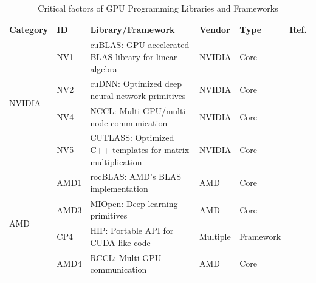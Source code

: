 \begin{table}[htbp]
	\centering
	\caption{Critical factors of GPU Programming Libraries and Frameworks}
	\label{tab:gpu_libraries}
	\begin{tabular}{llp{8cm}lll}
		\hline
		\small \textbf{Category} & \small \textbf{ID} & \small \textbf{Library/Framework}                                 & \small \textbf{Vendor} & \small \textbf{Type} & \small \textbf{Ref.}                                  \\
		\hline
		\multirow{4}{*}{\small NVIDIA}
		                         & \small NV1         & \small cuBLAS: GPU-accelerated BLAS library for linear algebra    & \small NVIDIA          & \small Core          & \small \cite{noauthor_cublas_nodate}                  \\[1ex]
		                         & \small NV2         & \small cuDNN: Optimized deep neural network primitives            & \small NVIDIA          & \small Core          & \small \cite{chetlur_cudnn_2014}                      \\[1ex]
		                         & \small NV4         & \small NCCL: Multi-GPU/multi-node communication                   & \small NVIDIA          & \small Core          & \small \cite{noauthor_nvidianccl_2025}                \\[1ex]
		                         & \small NV5         & \small CUTLASS: Optimized C++ templates for matrix multiplication & \small NVIDIA          & \small Core          & \small \cite{thakkar_cutlass_2023}                    \\
		\hline
		\multirow{4}{*}{\small AMD}
		                         & \small AMD1        & \small rocBLAS: AMD's BLAS implementation                         & \small AMD             & \small Core          & \small \cite{noauthor_rocmrocblas_2025}               \\[1ex]
		                         & \small AMD3        & \small MIOpen: Deep learning primitives                           & \small AMD             & \small Core          & \small \cite{noauthor_rocmmiopen_2025}                \\[1ex]
		                         & \small CP4         & \small HIP: Portable API for CUDA-like code                       & \small Multiple        & \small Framework     & \small \cite{noauthor_rocmhip_2025}                   \\[1ex]
		                         & \small AMD4        & \small RCCL: Multi-GPU communication                              & \small AMD             & \small Core          & \small \cite{noauthor_rocmrccl_2025}                  \\

\end{tabular}
\end{table}
